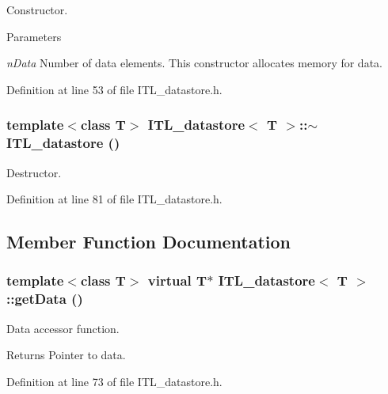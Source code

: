 Constructor. 


\begin{DoxyParams}{Parameters}
\item[{\em nData}]Number of data elements. This constructor allocates memory for data. \end{DoxyParams}


Definition at line 53 of file ITL\_\-datastore.h.

\hypertarget{classITL__datastore_a4691b58e9218237b709195d8f2a811eb}{
\subsubsection[{$\sim$ITL\_\-datastore}]{\setlength{\rightskip}{0pt plus 5cm}template$<$class T$>$ {\bf ITL\_\-datastore}$<$ T $>$::$\sim${\bf ITL\_\-datastore} ()}}
\label{classITL__datastore_a4691b58e9218237b709195d8f2a811eb}


Destructor. 



Definition at line 81 of file ITL\_\-datastore.h.



\subsection{Member Function Documentation}
\hypertarget{classITL__datastore_ac5d73b1499462140fafa2ca90634c721}{
\subsubsection[{getData}]{\setlength{\rightskip}{0pt plus 5cm}template$<$class T$>$ virtual T$\ast$ {\bf ITL\_\-datastore}$<$ T $>$::getData ()}}
\label{classITL__datastore_ac5d73b1499462140fafa2ca90634c721}


Data accessor function. 

\begin{DoxyReturn}{Returns}
Pointer to data. 
\end{DoxyReturn}


Definition at line 73 of file ITL\_\-datastore.h.

